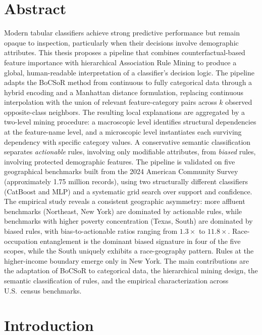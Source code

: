 \documentclass[a4paper,12pt]{report}
\begin{document}
\chapter*{Abstract}
Modern tabular classifiers achieve strong predictive performance but remain opaque to inspection, particularly when their decisions involve demographic attributes. This thesis proposes a pipeline that combines counterfactual-based feature importance with hierarchical Association Rule Mining to produce a global, human-readable interpretation of a classifier's decision logic. The pipeline adapts the BoCSoR method from continuous to fully categorical data through a hybrid encoding and a Manhattan distance formulation, replacing continuous interpolation with the union of relevant feature-category pairs across $k$ observed opposite-class neighbors. The resulting local explanations are aggregated by a two-level mining procedure: a macroscopic level identifies structural dependencies at the feature-name level, and a microscopic level instantiates each surviving dependency with specific category values. A conservative semantic classification separates \emph{actionable} rules, involving only modifiable attributes, from \emph{biased} rules, involving protected demographic features. The pipeline is validated on five geographical benchmarks built from the 2024 American Community Survey (approximately 1.75 million records), using two structurally different classifiers (CatBoost and MLP) and a systematic grid search over support and confidence. The empirical study reveals a consistent geographic asymmetry: more affluent benchmarks (Northeast, New York) are dominated by actionable rules, while benchmarks with higher poverty concentration (Texas, South) are dominated by biased rules, with bias-to-actionable ratios ranging from $1.3\times$ to $11.8\times$. Race-occupation entanglement is the dominant biased signature in four of the five scopes, while the South uniquely exhibits a race-geography pattern. Rules at the higher-income boundary emerge only in New York. The main contributions are the adaptation of BoCSoR to categorical data, the hierarchical mining design, the semantic classification of rules, and the empirical characterization across U.S.\ census benchmarks.

\newpage
\tableofcontents
\listoffigures
\listoftables

\clearpage
{}
\setcounter{page}{1}
\pagestyle{plain}
\hypersetup{pageanchor=true}

\chapter{Introduction}
\label{cap:introduction}

\end{document}
